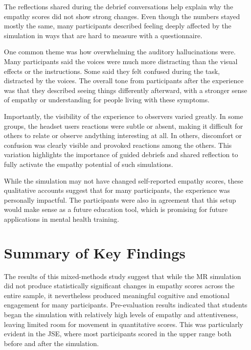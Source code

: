 The reflections shared during the debrief conversations help explain why the empathy scores did not show strong changes. Even though the numbers stayed mostly the same, many participants described feeling deeply affected by the simulation in ways that are hard to measure with a questionnaire.

One common theme was how overwhelming the auditory hallucinations were. Many participants said the voices were much more distracting than the visual effects or the instructions. Some said they felt confused during the task, distracted by the voices. The overall tone from participants after the experience was that they described seeing things differently afterward, with a stronger sense of empathy or understanding for people living with these symptoms.

\vspace{1em}

Importantly, the visibility of the experience to observers varied greatly. In some groups, the headset users reactions were subtle or absent, making it difficult for others to relate or observe andything interesting at all. In others, discomfort or confusion was clearly visible and provoked reactions among the others. This variation highlights the importance of guided debriefs and shared reflection to fully activate the empathy potential of such simulations.

While the simulation may not have changed self-reported empathy scores, these qualitative accounts suggest that for many participants, the experience was personally impactful. The participants were also in agreement that this setup would make sense as a future education tool, which is promising for future applications in mental health training.


\section{Summary of Key Findings}

The results of this mixed-methods study suggest that while the MR simulation did not produce statistically significant changes in empathy scores across the entire sample, it nevertheless produced meaningful cognitive and emotional engagement for many participants. Pre-evaluation results indicated that students began the simulation with relatively high levels of empathy and attentiveness, leaving limited room for  movement in quantitative scores. This was particularly evident in the JSE, where most participants scored in the upper range both before and after the simulation.

